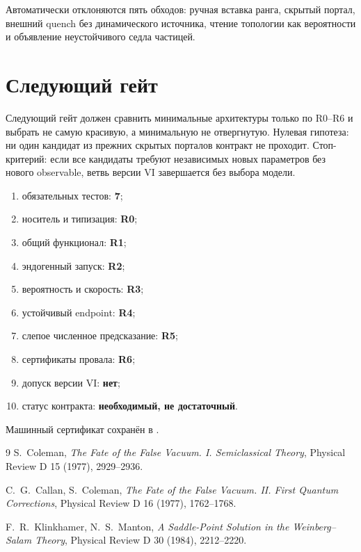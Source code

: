 \begin{nogocriterion}
Автоматически отклоняются пять обходов: ручная вставка ранга, скрытый
портал, внешний quench без динамического источника, чтение топологии как
вероятности и объявление неустойчивого седла частицей.
\end{nogocriterion}

\section{Следующий гейт}

Следующий гейт
должен сравнить минимальные архитектуры только по R0--R6 и выбрать не
самую красивую, а минимальную не отвергнутую. Нулевая гипотеза: ни один
кандидат из прежних скрытых порталов контракт не проходит. Стоп-критерий:
если все кандидаты требуют независимых новых параметров без нового
observable, ветвь версии VI завершается без выбора модели.

\begin{protocol}
\begin{enumerate}
 \item обязательных тестов: \textbf{7};
 \item носитель и типизация: \textbf{R0};
 \item общий функционал: \textbf{R1};
 \item эндогенный запуск: \textbf{R2};
 \item вероятность и скорость: \textbf{R3};
 \item устойчивый endpoint: \textbf{R4};
 \item слепое численное предсказание: \textbf{R5};
 \item сертификаты провала: \textbf{R6};
 \item допуск версии VI: \textbf{нет};
 \item статус контракта: \textbf{необходимый, не достаточный}.
\end{enumerate}
\end{protocol}

Машинный сертификат сохранён в
.

\begin{thebibliography}{9}
S.~Coleman, \emph{The Fate of the False Vacuum. I. Semiclassical Theory},
Physical Review D 15 (1977), 2929--2936.

C.~G.~Callan, S.~Coleman,
\emph{The Fate of the False Vacuum. II. First Quantum Corrections},
Physical Review D 16 (1977), 1762--1768.

F.~R.~Klinkhamer, N.~S.~Manton,
\emph{A Saddle-Point Solution in the Weinberg--Salam Theory},
Physical Review D 30 (1984), 2212--2220.
\end{thebibliography}